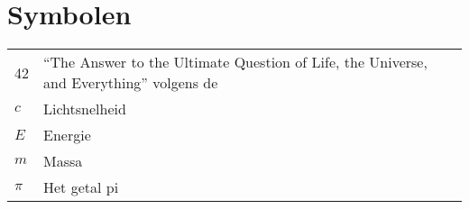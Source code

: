 \documentclass[master=ucll,11pt,dutch,twoside]{kulemt}
\makeatletter
\let\normalchangetocdepth\changetocdepth %
\newcommand\appendixtableofcontents{
	\begingroup
	\let\changetocdepth\@gobble
	\normalchangetocdepth{-10}
	\cftinsertcode{BREAK}{\normalchangetocdepth{3}}
	\renewcommand\contentsname{Appendices overzicht}
	\tableofcontents*
	\endgroup
}
\makeatother
\begin{document}
\section*{Symbolen}
\begin{flushleft}
  \renewcommand{\arraystretch}{1.1}
  \begin{tabularx}{\textwidth}{@{}p{12mm}X@{}}
    42    & ``The Answer to the Ultimate Question of Life, the Universe,
            and Everything'' volgens de \cite{h2g2} \\
    $c$   & Lichtsnelheid \\
    $E$   & Energie \\
    $m$   & Massa \\
    $\pi$ & Het getal pi \\
  \end{tabularx}
\end{flushleft}


\mainmatter




\pagestyle{ruledfilip}



%







\appendixpage*          %
\appendix







%
\end{document}
